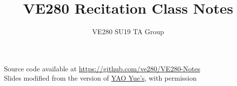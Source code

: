 \documentclass[slidestop,compress,mathserif]{beamer}
\title{VE280 Recitation Class Notes}
\author{VE280 SU19 TA Group}
\institute{UM-SJTU-JI}
\begin{document}
	\begin{frame} %
	\titlepage
	
	\tiny{
	Source code available at \url{https://github.com/ve280/VE280-Notes}\\
	Slides modified from the version of \href{https://github.com/tripack45/VE280-Notes}{YAO Yue's}, with permission}
	\end{frame}
	

	
	
\end{document}

